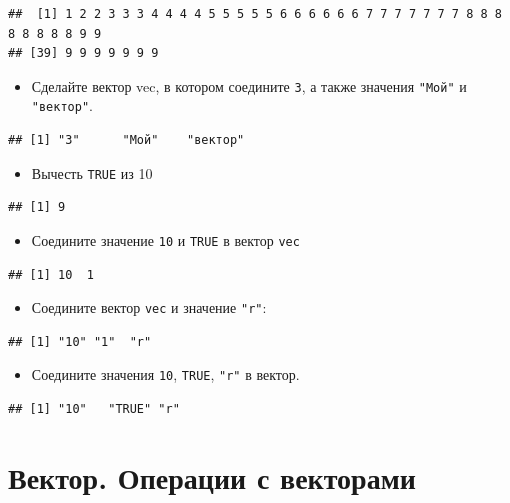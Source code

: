 \documentclass[]{book}
\providecommand{\tightlist}{%
  \setlength{\itemsep}{0pt}\setlength{\parskip}{0pt}}
\begin{document}
\begin{verbatim}
##  [1] 1 2 2 3 3 3 4 4 4 4 5 5 5 5 5 6 6 6 6 6 6 7 7 7 7 7 7 7 8 8 8 8 8 8 8 8 9 9
## [39] 9 9 9 9 9 9 9
\end{verbatim}

\begin{itemize}
\tightlist
\item
  Сделайте вектор vec, в котором соедините \texttt{3}, а также значения
  \texttt{"Мой"} и \texttt{"вектор"}.
\end{itemize}

\begin{verbatim}
## [1] "3"      "Мой"    "вектор"
\end{verbatim}

\begin{itemize}
\tightlist
\item
  Вычесть \texttt{TRUE} из 10
\end{itemize}

\begin{verbatim}
## [1] 9
\end{verbatim}

\begin{itemize}
\tightlist
\item
  Соедините значение \texttt{10} и \texttt{TRUE} в вектор \texttt{vec}
\end{itemize}

\begin{verbatim}
## [1] 10  1
\end{verbatim}

\begin{itemize}
\tightlist
\item
  Соедините вектор \texttt{vec} и значение \texttt{"r"}:
\end{itemize}

\begin{verbatim}
## [1] "10" "1"  "r"
\end{verbatim}

\begin{itemize}
\tightlist
\item
  Соедините значения \texttt{10}, \texttt{TRUE}, \texttt{"r"} в вектор.
\end{itemize}

\begin{verbatim}
## [1] "10"   "TRUE" "r"
\end{verbatim}

\section{Вектор. Операции с векторами}\label{vec_op}
\end{document}
